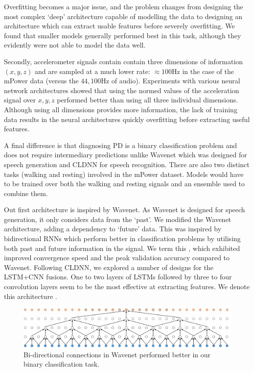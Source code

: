 \documentclass[12pt, twoside]{book}
\renewcommand\emph[1]{\textit{\color{USred}{#1}}}
\begin{document}
Overfitting becomes a major issue, and the problem changes from designing the most complex `deep' architecture capable of modelling the data to designing an architecture which can extract usable features before severely overfitting. We found that smaller models generally performed best in this task, although they evidently were not able to model the data well. 

Secondly, accelerometer signals contain contain three dimensions of information $(x,y,z)$ and are sampled at a much lower rate: $\approx100$Hz in the case of the mPower data (versus the $44,100$Hz of audio). Experiments with various neural network architectures showed that using the normed values of the acceleration signal over $x,y,z$ performed better than using all three individual dimensions. Although using all dimensions provides more information, the lack of training data results in the neural architectures quickly overfitting before extracting useful features. 

A final difference is that diagnosing PD is a binary classification problem and does not require intermediary predictions unlike Wavenet which was designed for speech generation and CLDNN for speech recognition. There are also two distinct tasks (walking and resting) involved in the mPower dataset. Models would have to be trained over both the walking and resting signals and an ensemble used to combine them.  

Out first architecture is inspired by Wavenet. As Wavenet is designed for speech generation, it only considers data from the `past'. We modified the Wavenet architecture, adding a dependency to `future' data. This was inspired by bidirectional RNNs which perform better in classification problems by utilising both past and future information in the signal. We term this \emph{Bi-Wavenet}, which exhibited improved convergence speed and the peak validation accuracy compared to Wavenet. Following CLDNN, we explored a number of designs for the LSTM+CNN fusions. One to two layers of LSTMs followed by three to four convolution layers seem to be the most effective at extracting features. We denote this architecture \emph{LSTMConv}. 


\begin{figure}[h]
	\centering\centerline{\includegraphics[width=1\linewidth]{biwavenet.png}}
	\caption{Bi-directional connections in Wavenet performed better in our binary classification task. }
	\label{biwavenet}
\end{figure}
\end{document}
